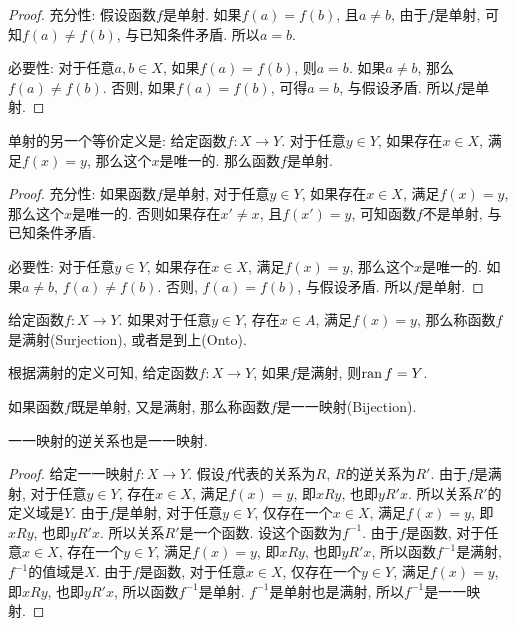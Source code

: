 \begin{proof}
	充分性: 假设函数$f$是单射. 如果$f(a)=f(b)$, 且$a\neq b$, 由于$f$是单射, 可知$f(a)\neq f(b)$, 与已知条件矛盾. 所以$a=b$.
	
	必要性: 对于任意$a,b \in X$, 如果$f(a)=f(b)$, 则$a=b$. 如果$a\neq b$, 那么$f(a)\neq f(b)$. 否则, 如果$f(a)=f(b)$, 可得$a=b$, 与假设矛盾. 所以$f$是单射.
\end{proof}

\begin{corollary}
	单射的另一个等价定义是: 给定函数$f\colon X\rightarrow Y$. 对于任意$y\in Y$, 如果存在$x\in X$, 满足$f(x)=y$, 那么这个$x$是唯一的. 那么函数$f$是单射.
\end{corollary}

\begin{proof}
	充分性: 如果函数$f$是单射, 对于任意$y\in Y$, 如果存在$x\in X$, 满足$f(x)=y$, 那么这个$x$是唯一的. 否则如果存在$x'\neq x$, 且$f(x')=y$, 可知函数$f$不是单射, 与已知条件矛盾.
	
	必要性: 对于任意$y\in Y$, 如果存在$x\in X$, 满足$f(x)=y$, 那么这个$x$是唯一的. 如果$a\neq b$, $f(a)\neq f(b)$. 否则, $f(a)=f(b)$, 与假设矛盾. 所以$f$是单射.
\end{proof}

\begin{definition}[满射]
	给定函数$f\colon X\rightarrow Y$. 如果对于任意$y\in Y$, 存在$x\in A$, 满足$f(x)=y$, 那么称函数$f$是满射(Surjection), 或者是到上(Onto).
\end{definition}

根据满射的定义可知, 给定函数$f\colon X\rightarrow Y$, 如果$f$是满射, 则$\operatorname{ran} f=Y$.

\begin{definition}[一一映射]
	如果函数$f$既是单射, 又是满射, 那么称函数$f$是一一映射(Bijection).
\end{definition}

\begin{proposition}
	一一映射的逆关系也是一一映射.
\end{proposition}

\begin{proof}
	给定一一映射$f\colon X\rightarrow Y$. 假设$f$代表的关系为$R$, $R$的逆关系为$R'$. 由于$f$是满射, 对于任意$y\in Y$, 存在$x\in X$, 满足$f(x)=y$, 即$xRy$, 也即$yR'x$. 所以关系$R'$的定义域是$Y$. 由于$f$是单射, 对于任意$y\in Y$, 仅存在一个$x\in X$, 满足$f(x)=y$, 即$xRy$, 也即$yR'x$. 所以关系$R'$是一个函数. 设这个函数为$f^{-1}$. 由于$f$是函数, 对于任意$x\in X$, 存在一个$y\in Y$, 满足$f(x)=y$, 即$xRy$, 也即$yR'x$, 所以函数$f^{-1}$是满射, $f^{-1}$的值域是$X$. 由于$f$是函数, 对于任意$x\in X$, 仅存在一个$y\in Y$, 满足$f(x)=y$, 即$xRy$, 也即$yR'x$, 所以函数$f^{-1}$是单射. $f^{-1}$是单射也是满射, 所以$f^{-1}$是一一映射.
\end{proof}

